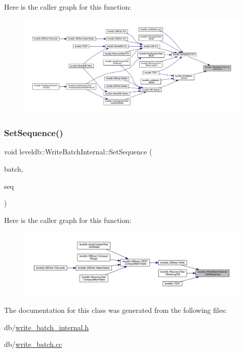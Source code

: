 Here is the caller graph for this function\+:
\nopagebreak
\begin{figure}[H]
\begin{center}
\leavevmode
\includegraphics[width=350pt]{classleveldb_1_1_write_batch_internal_ae03d20619da53aae175dd28d61c90bd9_icgraph}
\end{center}
\end{figure}
\mbox{\label{classleveldb_1_1_write_batch_internal_a0ca3483de37433fb0ce37b1e91f01bd1}} 
\subsubsection{\texorpdfstring{SetSequence()}{SetSequence()}}
{\footnotesize\ttfamily void leveldb\+::\+Write\+Batch\+Internal\+::\+Set\+Sequence (\begin{DoxyParamCaption}\item[{\mbox{\hyperlink{classleveldb_1_1_write_batch}{Write\+Batch}} $\ast$}]{batch,  }\item[{\mbox{\hyperlink{namespaceleveldb_a5481ededd221c36d652c371249f869fa}{Sequence\+Number}}}]{seq }\end{DoxyParamCaption})\hspace{0.3cm}{\ttfamily [static]}}

Here is the caller graph for this function\+:
\nopagebreak
\begin{figure}[H]
\begin{center}
\leavevmode
\includegraphics[width=350pt]{classleveldb_1_1_write_batch_internal_a0ca3483de37433fb0ce37b1e91f01bd1_icgraph}
\end{center}
\end{figure}


The documentation for this class was generated from the following files\+:\begin{DoxyCompactItemize}
\item 
db/\mbox{\hyperlink{write__batch__internal_8h}{write\+\_\+batch\+\_\+internal.\+h}}\item 
db/\mbox{\hyperlink{write__batch_8cc}{write\+\_\+batch.\+cc}}\end{DoxyCompactItemize}
